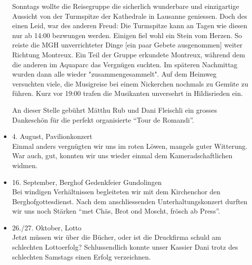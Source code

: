 \begin{history}
\begin{itemize}
        Sonntags wollte die Reisegruppe die sicherlich wunderbare und
        einzigartige Aussicht von der Turmspitze der Kathedrale in Lausanne
        geniessen. Doch des einen Leid, war des anderen Freud: Die Turmspitze
        kann an Tagen wie diesen nur ab 14:00 bezwungen werden. Einigen fiel
        wohl ein Stein vom Herzen. So reiste die MGH unverrichteter Dinge [ein
                paar Gebete ausgenommen] weiter Richtung Montreux. Ein Teil der Gruppe
        erkundete Montreux, während dem die anderen im Aquaparc das Vergnügen
        suchten. Im späteren Nachmittag wurden dann alle wieder
        "zusammengesammelt". Auf dem Heimweg versuchten viele, die Musigreise
        bei einem Nickerchen nochmals zu Gemüte zu führen. Kurz vor 19:00 trafen
        die Musikanten unversehrt in Hildisrieden ein.

        An dieser Stelle gebührt Mätthu Rub und Dani Fleischli ein grosses
        Dankeschön für die perfekt organisierte \enquote{Tour de Romandi}.

        \item[]4. August, Pavilionkonzert\\
        Einmal anders vergnügten wir uns im roten Löwen, mangels guter
        Witterung. War auch, gut, konnten wir uns wieder einmal dem
        Kameradschaftlichen widmen.

        \item[]16. September, Berghof Gedenkfeier Gundolingen\\
        Bei windigen Verhältnissen begleiteten wir mit dem Kirchenchor den
        Berghofgottesdienst. Nach dem anschliessenden Unterhaltungskonzert
        durften wir uns noch Stärken \enquote{met Chäs, Brot ond Moscht, frösch
            ab Press}.

        \item[]26./27. Oktober, Lotto\\
        Jetzt müssen wir über die Bücher, oder ist die Druckfirma schuld am
        schlechten Lottoerfolg? Schlussendlich konnte unser Kassier Dani trotz
        des schlechten Samstags einen Erfolg verzeichnen.


    \end{itemize}

\end{history}

